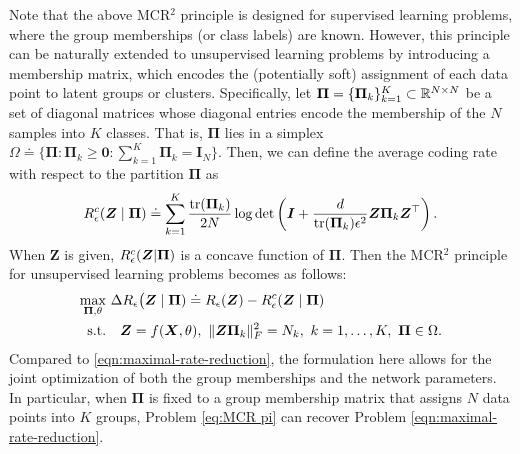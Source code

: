 \documentclass[../../book-main.tex]{subfiles}
\begin{document}
 
    Note that the above MCR$^2$  principle is designed for supervised learning problems, where the group memberships (or class labels) are known. However, this principle can be naturally extended to unsupervised learning problems by introducing a membership matrix, which encodes the (potentially soft) assignment of each data point to latent groups or clusters. Specifically, let $\bm \Pi = \{\bm \Pi_k\}_{k=1}^K \subset \mathbb{R}^{N\times N}$ be a set of diagonal matrices whose diagonal entries encode the membership of the $N$ samples into $K$ classes. That is, $\bm \Pi$ lies in a simplex $\Omega \doteq \{\bm \Pi: \bm \Pi_k \ge \bm 0: \sum_{k=1}^K \bm \Pi_k = \bm I_N\}$. Then, we can define the average coding rate with respect to the partition $\bm \Pi$ as
    \begin{align}\label{eq:MCRc}
        R_{\epsilon}^c(\bm{Z} \mid \bm \Pi) \doteq \sum_{k=1}^K \frac{\mathrm{tr}(\bm \Pi_k)}{2N}\log\det\left(\bm I + \frac{d}{\mathrm{tr}(\bm \Pi_k)\epsilon^2}\bm Z\bm \Pi_k \bm Z^\top \right).
    \end{align}
    When $\bm Z$ is given, $R_{\epsilon}^c(\bm{Z} \vert \bm \Pi)$ is a concave function of $\bm \Pi$. Then the MCR$^2$ principle for unsupervised learning problems becomes as follows:
    \begin{align}\label{eq:MCR pi}
        \max_{\bm \Pi, \theta} & \  \Delta R_{\epsilon}\big(\bm{Z}  \mid \bm \Pi) \doteq R_{\epsilon}(\bm Z) - R_{\epsilon}^c(\bm{Z} \mid \bm \Pi) \notag \\ 
       \mathrm{s.t.}  & \ \ \ \bm Z = f(\bm X, \theta),\ \|\bm Z \bm \Pi_k\|_F^2 = N_k,\ k = 1,\dots,K,\ \bm\Pi \in \Omega. 
    \end{align}
    Compared to \eqref{eqn:maximal-rate-reduction}, the formulation here allows for the joint optimization of both the group memberships and the network parameters. In particular, when $\bm \Pi$ is fixed to a group membership matrix that assigns $N$ data points into $K$ groups, Problem \eqref{eq:MCR pi} can recover Problem \eqref{eqn:maximal-rate-reduction}.
 
\end{document}
